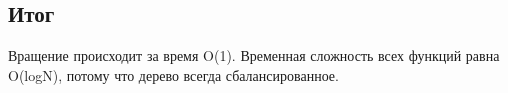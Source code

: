\documentclass[otchet]{SCWorks}
\begin{document}
\subsection*{Итог}
Вращение происходит за время O(1). Временная сложность всех функций равна O(logN), потому что дерево всегда сбалансированное.


	


\appendix
\end{document}
